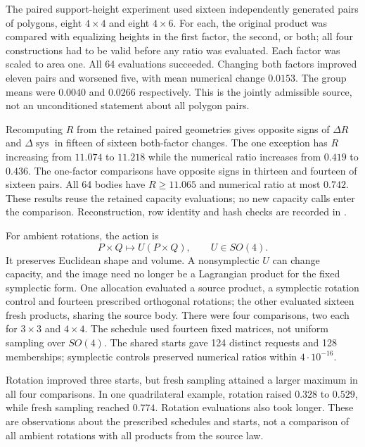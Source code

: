 The paired support-height experiment used sixteen independently generated
pairs of polygons, eight $4\times4$ and eight $4\times6$. For each,
the original product was compared with equalizing heights in the first
factor, the second, or both; all four constructions had to be valid before
any ratio was evaluated. Each factor was scaled to area one. All 64
evaluations succeeded. Changing both factors improved eleven pairs and
worsened five, with mean numerical change $0.0153$. The group means were
$0.0040$ and $0.0266$ respectively. This is the jointly admissible source,
not an unconditioned statement about all polygon pairs.

Recomputing $R$ from the retained paired geometries gives opposite signs
of $\Delta R$ and $\Delta\widehat{\operatorname{sys}}$ in fifteen of
sixteen both-factor changes. The one exception has $R$ increasing from
$11.074$ to $11.218$ while the numerical ratio increases from $0.419$
to $0.436$. The one-factor comparisons have opposite signs in thirteen
and fourteen of sixteen pairs. All 64 bodies have $R\geq11.065$ and
numerical ratio at most $0.742$. These results reuse the retained capacity
evaluations; no new capacity calls enter the comparison. Reconstruction,
row identity and hash checks are recorded in
.

For ambient rotations, the action is
\[
 P\times Q\longmapsto U(P\times Q),\qquad U\in SO(4).
\]
It preserves Euclidean shape and volume. A nonsymplectic $U$ can change
capacity, and the image need no longer be a Lagrangian product for the
fixed symplectic form. One allocation evaluated a source product, a
symplectic rotation control and fourteen prescribed orthogonal rotations;
the other evaluated sixteen fresh products, sharing the source body.
There were four comparisons, two each for $3\times3$ and $4\times4$.
The schedule used fourteen fixed matrices, not uniform sampling over
$SO(4)$. The shared starts gave 124 distinct requests and 128 memberships;
symplectic controls preserved numerical ratios within $4\cdot10^{-16}$.

Rotation improved three starts, but fresh sampling attained a larger
maximum in all four comparisons. In one quadrilateral example, rotation
raised $0.328$ to $0.529$, while fresh sampling reached $0.774$.
Rotation evaluations also took longer. These are observations about the
prescribed schedules and starts, not a comparison of all ambient rotations
with all products from the source law.

